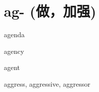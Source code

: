 \chapter{ag- (做，加强)}

\begin{word}{agenda}
\end{word}

\begin{word}{agency}
\end{word}

\begin{word}{agent}
\end{word}

\begin{word}{aggress, aggressive, aggressor}
\end{word}